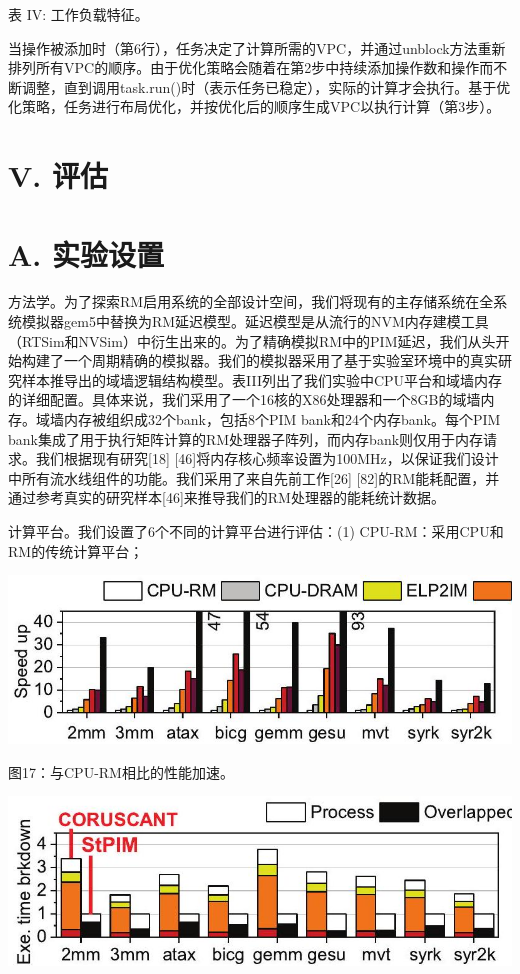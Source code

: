 \documentclass[10pt]{article}
\begin{document}
表 IV: 工作负载特征。

当操作被添加时（第6行），任务决定了计算所需的VPC，并通过unblock方法重新排列所有VPC的顺序。由于优化策略会随着在第2步中持续添加操作数和操作而不断调整，直到调用task.run()时（表示任务已稳定），实际的计算才会执行。基于优化策略，任务进行布局优化，并按优化后的顺序生成VPC以执行计算（第3步）。

\section*{V. 评估}
\section*{A. 实验设置}
方法学。为了探索RM启用系统的全部设计空间，我们将现有的主存储系统在全系统模拟器gem5中替换为RM延迟模型。延迟模型是从流行的NVM内存建模工具（RTSim和NVSim）中衍生出来的。为了精确模拟RM中的PIM延迟，我们从头开始构建了一个周期精确的模拟器。我们的模拟器采用了基于实验室环境中的真实研究样本推导出的域墙逻辑结构模型。表III列出了我们实验中CPU平台和域墙内存的详细配置。具体来说，我们采用了一个16核的X86处理器和一个8GB的域墙内存。域墙内存被组织成32个bank，包括8个PIM bank和24个内存bank。每个PIM bank集成了用于执行矩阵计算的RM处理器子阵列，而内存bank则仅用于内存请求。我们根据现有研究[18] [46]将内存核心频率设置为100MHz，以保证我们设计中所有流水线组件的功能。我们采用了来自先前工作[26] [82]的RM能耗配置，并通过参考真实的研究样本[46]来推导我们的RM处理器的能耗统计数据。

计算平台。我们设置了6个不同的计算平台进行评估：(1) CPU-RM：采用CPU和RM的传统计算平台；

\begin{center}
\includegraphics[max width=\textwidth]{2024_05_12_abeba8a85da5b5ec4c7bg-10(1)}
\end{center}

图17：与CPU-RM相比的性能加速。

\begin{center}
\includegraphics[max width=\textwidth]{2024_05_12_abeba8a85da5b5ec4c7bg-10(3)}
\end{center}
\end{document}
